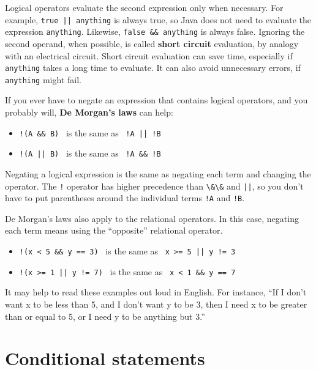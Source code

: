 \documentclass[12pt]{book}
\theoremstyle{exercise}
\newcommand{\java}[1]{\verb"#1"}
\begin{document}

Logical operators evaluate the second expression only when necessary.
For example, \java{true || anything} is always true, so Java does not need to evaluate the expression \java{anything}.
Likewise, \texttt{false \&\& anything} is always false.
Ignoring the second operand, when possible, is called {\bf short circuit} evaluation, by analogy with an electrical circuit.
Short circuit evaluation can save time, especially if \java{anything} takes a long time to evaluate.
It can also avoid unnecessary errors, if \java{anything} might fail.


If you ever have to negate an expression that contains logical operators, and you probably will, {\bf De Morgan's laws} can help:

\begin{itemize}
\item \texttt{!(A \&\& B)} ~is the same as~ \java{!A || !B}
\item \java{!(A || B)} ~is the same as~ \texttt{!A \&\& !B}
\end{itemize}

Negating a logical expression is the same as negating each term and changing the operator.
The \java{!} operator has higher precedence than \java{\&\&} and \java{||}, so you don't have to put parentheses around the individual terms \java{!A} and \java{!B}.

De Morgan's laws also apply to the relational operators.
In this case, negating each term means using the ``opposite'' relational operator.

\begin{itemize}
\item \texttt{!(x < 5 \&\& y == 3)} ~is the same as~ \java{x >= 5 || y != 3}
\item \java{!(x >= 1 || y != 7)} ~is the same as~ \texttt{x < 1 \&\& y == 7}
\end{itemize}

It may help to read these examples out loud in English.
For instance, ``If I don't want x to be less than 5, and I don't want y to be 3, then I need x to be greater than or equal to 5, or I need y to be anything but 3.''


\section{Conditional statements}

\end{document}
